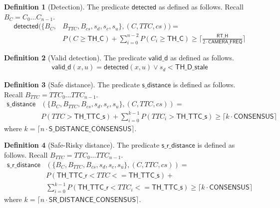 \documentclass[12pt]{article}
\theoremstyle{definition}
\newtheorem{definition}{Definition}[section]
\begin{document}
\begin{definition}[Detection]
    The predicate $\mathsf{detected}$ as defined as follows. Recall $B_C = C_0 \ldots C_{n-1}$.
    \[
        \begin{aligned}
                \mathsf{detected}(\{B_C, &B_{TTC}, B_{cs}, s_d, s_c, s_u\}, (C,TTC,cs)) = \\
                &P(C \geq \mathsf{TH\_C}) + \sum_{i=0}^{n-2} P(C_i \geq \mathsf{TH\_C}) \geq \lceil \frac{\mathsf{RT\_H}}{ 2 \cdot \mathsf{CAMERA\_FREQ}} \rceil
        \end{aligned}
    \]
\end{definition}

\begin{definition}[Valid detection]
    The predicate $\mathsf{valid\_d}$ as defined as follows.
    \[
        \begin{aligned}
                \mathsf{valid\_d}(x,u) = \mathsf{detected}(x,u) \lor s_d < \mathsf{TH\_D\_stale}
        \end{aligned}
    \]
\end{definition}

\begin{definition}[Safe distance]
The predicate $\mathsf{s\_distance}$ is defined as follows. Recall $B_{TTC} = TTC_0 \ldots TTC_{n-1}$.
\[
    \begin{aligned}
            \mathsf{s\_distance}&(\{B_C, B_{TTC}, B_{cs}, s_d, s_c, s_u\}, (C,TTC,cs)) = \\
            &P(TTC > \mathsf{TH\_TTC\_s}) + \sum_{i=0}^{k-1} P(TTC_i > \mathsf{TH\_TTC\_s}) \geq \lceil k \cdot \mathsf{ CONSENSUS}\rceil
    \end{aligned}
\]
where $k = \lceil n \cdot \mathsf{S\_DISTANCE\_CONSENSUS} \rceil$.
    
\end{definition}

\begin{definition}[Safe-Risky distance]
The predicate $\mathsf{s\_r\_distance}$ is defined as follows. Recall $B_{TTC} = TTC_0 \ldots TTC_{n-1}$.
\[
    \begin{aligned}
        \mathsf{s\_r\_distance}&(\{B_C, B_{TTC}, B_{cs}, s_d, s_c, s_u\}, (C,TTC,cs)) = \\
        &P(\mathsf{TH\_TTC\_r} < TTC <= \mathsf{TH\_TTC\_s}) + \\
        &\sum_{i=0}^{k-1} P(\mathsf{TH\_TTC\_r} < TTC_i <= \mathsf{TH\_TTC\_s}) \geq \lceil k \cdot \mathsf{CONSENSUS}\rceil
    \end{aligned}
\]
where $k = \lceil n \cdot \mathsf{SR\_DISTANCE\_CONSENSUS} \rceil$.
    
\end{definition}
\end{document}
